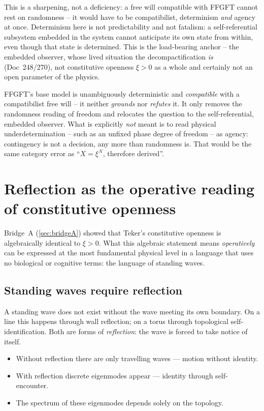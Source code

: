 This is a sharpening, not a deficiency: a free will compatible with FFGFT cannot rest on randomness -- it would have to be compatibilist, determinism \emph{and} agency at once. Determinism here is not predictability and not fatalism: a self-referential subsystem embedded in the system cannot anticipate its own state from within, even though that state is determined. This is the load-bearing anchor -- the embedded observer, whose lived situation the decompactification \emph{is} (Doc~248/270), not constitutive openness $\xi>0$ as a whole and certainly not an open parameter of the physics.

\begin{interpretation}
FFGFT's base model is unambiguously deterministic and \emph{compatible} with a compatibilist free will -- it neither \emph{grounds} nor \emph{refutes} it. It only removes the randomness reading of freedom and relocates the question to the self-referential, embedded observer. What is explicitly \emph{not} meant is to read physical underdetermination -- such as an unfixed phase degree of freedom -- as agency: contingency is not a decision, any more than randomness is. That would be the same category error as \enquote{$X=\xi^N$, therefore derived}.
\end{interpretation}

\section{Reflection as the operative reading of constitutive openness}\label{sec:reflection}

Bridge~A (\ref{sec:bridgeA}) showed that Teker's constitutive openness is algebraically identical to $\xi > 0$. What this algebraic statement means \emph{operatively} can be expressed at the most fundamental physical level in a language that uses no biological or cognitive terms: the language of standing waves.

\subsection{Standing waves require reflection}\label{sec:reflection_standing}

A standing wave does not exist without the wave meeting its own boundary. On a line this happens through wall reflection; on a torus through topological self-identification. Both are forms of \emph{reflection}: the wave is forced to take notice of itself.

\begin{itemize}
\item Without reflection there are only travelling waves --- motion without identity.
\item With reflection discrete eigenmodes appear --- identity through self-encounter.
\item The spectrum of these eigenmodes depends solely on the topology.
\end{itemize}

